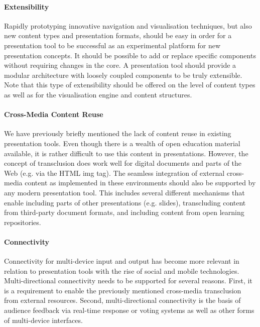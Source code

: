      \paragraph{Extensibility} Rapidly prototyping innovative navigation and
      visualisation techniques, but also new content types and presentation
      formats, should be easy in order for a presentation tool to be successful
      as an experimental platform for new presentation concepts. It should be
      possible to add or replace specific components without requiring changes
      in the core. A presentation tool should provide a modular architecture
      with loosely coupled components to be truly extensible. Note that this
      type of extensibility should be offered on the level of content types as
      well as for the visualisation engine and content structures.

     \paragraph{Cross-Media Content Reuse} We have previously briefly mentioned
      the lack of content reuse in existing presentation tools. Even though
      there is a wealth of open education material available, it is rather
      difficult to use this content in presentations. However, the concept of
      transclusion does work well for digital documents and parts of the Web
      (e.g. via the HTML img tag). The seamless integration of external
      cross-media content as implemented in these environments should also be
      supported by any modern presentation tool. This includes several
      different mechanisms that enable including parts of other presentations
      (e.g. slides), transcluding content from third-party document formats,
      and including content from open learning repositories.

     \paragraph{Connectivity}

      Connectivity for multi-device input and output has become more relevant
      in relation to presentation tools with the rise of social and mobile
      technologies. Multi-directional connectivity needs to be supported for
      several reasons. First, it is a requirement to enable the previously
      mentioned cross-media transclusion from external resources. Second,
      multi-directional connectivity is the basis of audience feedback via
      real-time response or voting systems \citep{dufresne-1} as well as other
      forms of multi-device interfaces.

